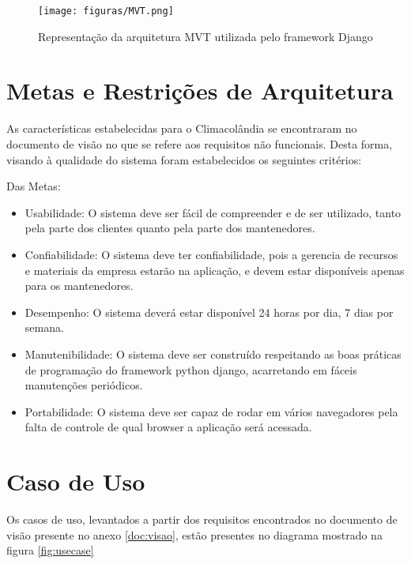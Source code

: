 \begin{figure}[h!]
	\centering
	\texttt{[image: figuras/MVT.png]}
	\caption{Representação da arquitetura MVT utilizada pelo framework Django}
	\label{fig:mvt}
\end{figure}

\section{Metas e Restrições de Arquitetura}

As características estabelecidas para o Climacolândia se encontraram no documento de visão no que se refere aos requisitos não funcionais. Desta forma, visando à qualidade do sistema foram estabelecidos os seguintes critérios:

Das Metas:

\begin{itemize}
	\item Usabilidade: O sistema deve ser fácil de compreender e de ser utilizado, tanto pela parte dos clientes quanto pela parte dos mantenedores.
	\item Confiabilidade: O sistema deve ter confiabilidade, pois a gerencia de recursos e materiais da empresa estarão na aplicação, e devem estar disponíveis apenas para os mantenedores.
	\item Desempenho:	O sistema deverá estar disponível 24 horas por dia, 7 dias por semana.
	\item Manutenibilidade: O sistema deve ser construído respeitando as boas práticas de programação do framework python django, acarretando em fáceis manutenções periódicos.
	\item Portabilidade: O sistema deve ser capaz de rodar em vários navegadores pela falta de controle de qual browser a aplicação será acessada.
\end{itemize}

\section{Caso de Uso}

Os casos de uso, levantados a partir dos requisitos encontrados no documento de visão presente no anexo \ref{doc:visao}, estão presentes no diagrama mostrado na figura \ref{fig:usecase}

